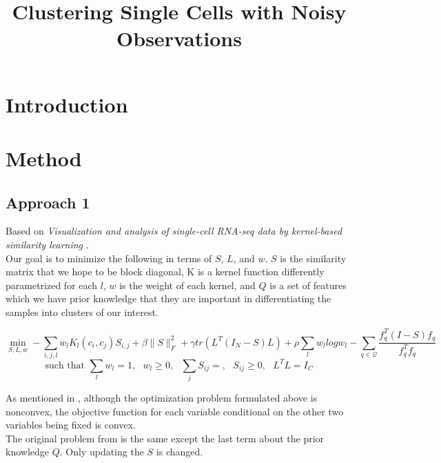 \documentclass[11pt]{article}
\title{Clustering Single Cells with Noisy Observations}
\begin{document}
\maketitle
\section{Introduction}

\section{Method}
\subsection{Approach 1}
Based on \textit{Visualization and analysis of single-cell RNA-seq data by kernel-based similarity learning} \cite{wang2017visualization}.\\

\noindent 
Our goal is to minimize the following in terms of $S$, $L$, and $w$. $S$ is the similarity matrix that we hope to be block diagonal, K is a kernel function differently parametrized for each $l$, $w$ is the weight of each kernel, and $Q$ is a set of features which we have prior knowledge that they are important in differentiating the samples into clusters of our interest.


\begin{equation}
\min_{S,L,w} -\sum_{i,j,l} w_l K_l (c_i,c_j) S_{i,j} + \beta \|S\|_F^2 + \gamma tr(L^T(I_N-S)L) + \rho \sum_l w_l log w_l - \sum_{q \in \mathcal{Q}} \frac{f_q^T (I-S) f_q}{f_q^T f_q}
\end{equation}
$$\text{such that  } \sum_l w_l = 1,\text{  } w_l \geq 0, \text{  }\sum_{j} S_{ij} = ,\text{  } S_{ij} \geq 0, \text{  }L^TL = I_C $$

\noindent As mentioned in \cite{wang2017visualization}, although the optimization problem formulated above is nonconvex, the objective function for each variable conditional on the other two variables being fixed is convex. \\

\noindent The original problem from \cite{wang2017visualization} is the same except the last term about the prior knowledge $Q$. Only updating the $S$ is changed.\\
\end{document}
